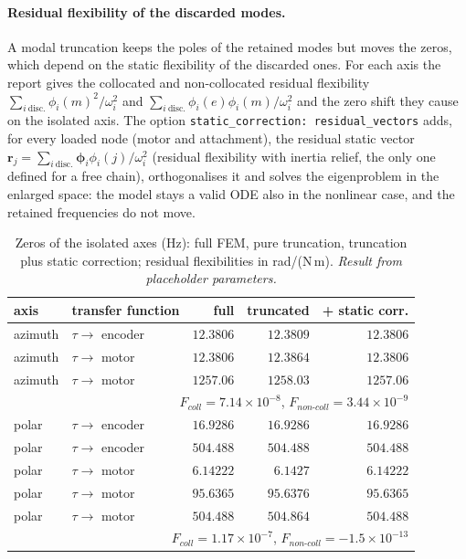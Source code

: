 \documentclass[10pt,a4paper]{article}
\numberwithin{equation}{section}
\begin{document}
\paragraph{Residual flexibility of the discarded modes.} A modal truncation keeps the poles of the retained modes but moves the zeros, which depend on the static flexibility of the discarded ones. For each axis the report gives the collocated and non-collocated residual flexibility $\sum_{i\ \text{disc.}}\phi_i(m)^2/\omega_i^2$ and $\sum_{i\ \text{disc.}}\phi_i(e)\phi_i(m)/\omega_i^2$ and the zero shift they cause on the isolated axis. The option \texttt{static\_correction: residual\_vectors} adds, for every loaded node (motor and attachment), the residual static vector $\mathbf r_j = \sum_{i\ \text{disc.}}\boldsymbol\phi_i\phi_i(j)/\omega_i^2$ (residual flexibility with inertia relief, the only one defined for a free chain), orthogonalises it and solves the eigenproblem in the enlarged space: the model stays a valid ODE also in the nonlinear case, and the retained frequencies do not move.
\begin{table}[H]\centering\small
\caption{Zeros of the isolated axes (Hz): full FEM, pure truncation, truncation plus static correction; residual flexibilities in rad/(N\,m). \emph{Result from placeholder parameters.}}\label{tab:modal_zeros}
\begin{tabular}{llrrr}\toprule
axis & transfer function & full & truncated & + static corr. \\ \midrule
azimuth & $\tau\to$ encoder & $12.3806$ & $12.3809$ & $12.3806$ \\
azimuth & $\tau\to$ motor & $12.3806$ & $12.3864$ & $12.3806$ \\
azimuth & $\tau\to$ motor & $1257.06$ & $1258.03$ & $1257.06$ \\
\multicolumn{5}{r}{\footnotesize $F_{coll} = 7.14\times10^{-8}$, $F_{non\text{-}coll} = 3.44\times10^{-9}$} \\ \midrule
polar & $\tau\to$ encoder & $16.9286$ & $16.9286$ & $16.9286$ \\
polar & $\tau\to$ encoder & $504.488$ & $504.488$ & $504.488$ \\
polar & $\tau\to$ motor & $6.14222$ & $6.1427$ & $6.14222$ \\
polar & $\tau\to$ motor & $95.6365$ & $95.6376$ & $95.6365$ \\
polar & $\tau\to$ motor & $504.488$ & $504.864$ & $504.488$ \\
\multicolumn{5}{r}{\footnotesize $F_{coll} = 1.17\times10^{-7}$, $F_{non\text{-}coll} = -1.5\times10^{-13}$} \\ \midrule
\bottomrule\end{tabular}\end{table}
\end{document}
